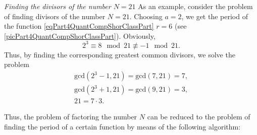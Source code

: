\begin{example}
\emph{Finding the divisors of the number $N=21$}
\label{exPart4QuantCompShorGCD}
As an example, consider the problem of finding divisors of the number $N =
21$. Choosing $a=2$, we get the period of the function
\eqref{eqPart4QuantCompShorClassPart} $r = 6$ (see
\autoref{picPart4QuantCompShorClassPart}). 
Obviously,
\[
2^3 \equiv 8 \mod{21} \not\equiv -1 \mod{21}.
\]
Thus, by finding the corresponding greatest common divisors, we solve
the problem
\begin{eqnarray}
\mbox{gcd}\left( 2^3 - 1, 21 \right) = \mbox{gcd}\left( 7, 21 \right)
= 7,
\nonumber \\
\mbox{gcd}\left( 2^3 + 1, 21 \right) = \mbox{gcd}\left( 9, 21 \right)
= 3,
\nonumber \\
21 = 7 \cdot 3.
\nonumber
\end{eqnarray}
\end{example}

Thus, the problem of factoring the number $N$ can be reduced to
the problem of finding the period of a certain function by means of the
following algorithm:
